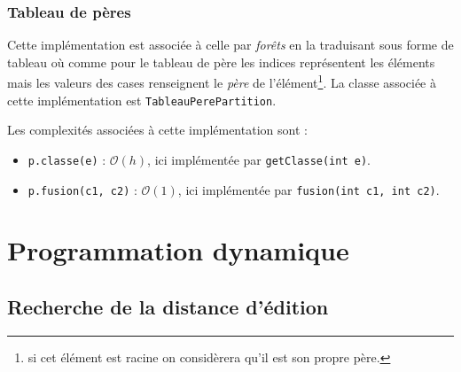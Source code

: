 \documentclass[12pt, a4paper]{report}
\begin{document}
    \subsection{Tableau de pères}

    Cette implémentation est associée à celle par \emph{forêts} en la traduisant sous forme de tableau où comme pour le tableau de père les indices représentent les éléments mais les valeurs des cases renseignent le \emph{père} de l'élément\footnote{si cet élément est racine on considèrera qu'il est son propre père.}. La classe associée à cette implémentation est \texttt{TableauPerePartition}.

    Les complexités associées à cette implémentation sont :
    \begin{itemize}
        \item \texttt{p.classe(e)} : $\mathcal{O}(h)$, ici implémentée par \texttt{getClasse(int e)}.
        \item \texttt{p.fusion(c1, c2)} : $\mathcal{O}(1)$, ici implémentée par \texttt{fusion(int c1, int c2)}.
    \end{itemize}

\chapter{Programmation dynamique}
    \section{Recherche de la distance d'édition}
\end{document}
